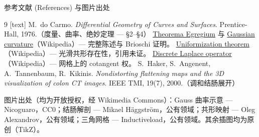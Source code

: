 \documentclass[aspectratio=169,10pt]{beamer}
\begin{document}
\begin{frame}{参考文献 (References) 与图片出处}
  \footnotesize
  \begin{thebibliography}{9}
    [text]
     M.~do Carmo. \emph{Differential Geometry of Curves and Surfaces}. Prentice-Hall, 1976.（度量、曲率、绝妙定理 --- \S2--\S4）
     \href{https://en.wikipedia.org/wiki/Theorema_Egregium}{Theorema Egregium} 与 \href{https://en.wikipedia.org/wiki/Gaussian_curvature}{Gaussian curvature}（Wikipedia）--- 完整陈述与 Brioschi 证明。
     \href{https://en.wikipedia.org/wiki/Uniformization_theorem}{Uniformization theorem}（Wikipedia）--- 光滑共形存在性，引用未证。
     \href{https://en.wikipedia.org/wiki/Discrete_Laplace_operator}{Discrete Laplace operator}（Wikipedia）--- 网格上的 cotangent 权。
     S.~Haker, S.~Angenent, A.~Tannenbaum, R.~Kikinis. \emph{Nondistorting flattening maps and the 3D visualization of colon CT images}. IEEE TMI, 19(7), 2000.（调和结肠展开）
  \end{thebibliography}
  \smallskip
  {\scriptsize 图片出处（均为开放授权，经 Wikimedia Commons）：Gauss 曲率示意 --- Nicoguaro，CC0；结肠解剖 --- Mikael Häggström，公有领域；共形映射 --- Oleg Alexandrov，公有领域；三角网格 --- Inductiveload，公有领域。其余插图均为原创（TikZ）。}
\end{frame}
\end{document}
